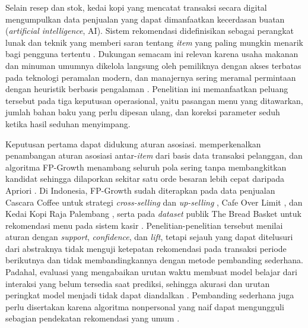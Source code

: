 Selain resep dan stok, kedai kopi yang mencatat transaksi secara digital mengumpulkan data penjualan yang dapat dimanfaatkan kecerdasan buatan (\textit{artificial intelligence}, AI). Sistem rekomendasi didefinisikan sebagai perangkat lunak dan teknik yang memberi saran tentang \textit{item} yang paling mungkin menarik bagi pengguna tertentu \citep*{ricci2021recommender}. Dukungan semacam ini relevan karena usaha makanan dan minuman umumnya dikelola langsung oleh pemiliknya dengan akses terbatas pada teknologi peramalan modern, dan manajernya sering meramal permintaan dengan heuristik berbasis pengalaman \citep*{groene2024introduction}. Penelitian ini memanfaatkan peluang tersebut pada tiga keputusan operasional, yaitu pasangan menu yang ditawarkan, jumlah bahan baku yang perlu dipesan ulang, dan koreksi parameter seduh ketika hasil seduhan menyimpang.

Keputusan pertama dapat didukung aturan asosiasi. \citet*{agrawal1993mining} memperkenalkan penambangan aturan asosiasi antar-\textit{item} dari basis data transaksi pelanggan, dan algoritma FP-Growth menambang seluruh pola sering tanpa membangkitkan kandidat sehingga dilaporkan sekitar satu orde besaran lebih cepat daripada Apriori \citep*{han2000mining}. Di Indonesia, FP-Growth sudah diterapkan pada data penjualan Cascara Coffee untuk strategi \textit{cross-selling} dan \textit{up-selling} \citep*{fadillah2021data}, Cafe Over Limit \citep*{hasan2023utilization}, dan Kedai Kopi Raja Palembang \citep*{pratama2025food}, serta pada \textit{dataset} publik The Bread Basket \citep*{mittal2020bread} untuk rekomendasi menu pada sistem kasir \citep*{sihombing2026analisis}. Penelitian-penelitian tersebut menilai aturan dengan \textit{support}, \textit{confidence}, dan \textit{lift}, tetapi sejauh yang dapat ditelusuri dari abstraknya tidak menguji ketepatan rekomendasi pada transaksi periode berikutnya dan tidak membandingkannya dengan metode pembanding sederhana. Padahal, evaluasi yang mengabaikan urutan waktu membuat model belajar dari interaksi yang belum tersedia saat prediksi, sehingga akurasi dan urutan peringkat model menjadi tidak dapat diandalkan \citep*{ji2023critical}. Pembanding sederhana juga perlu disertakan karena algoritma nonpersonal yang naif dapat mengungguli sebagian pendekatan rekomendasi yang umum \citep*{cremonesi2010performance}.

